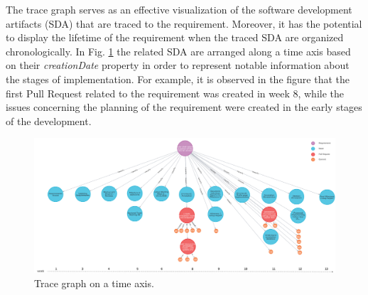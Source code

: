 The trace graph serves as an effective visualization of the software development artifacts (SDA) that are traced to the requirement. Moreover, it has the potential to display the lifetime of the requirement when the traced SDA are organized chronologically.
In Fig. \ref{fig:tracegraph} the related SDA are arranged along a time axis based on their \textit{creationDate} property in order to represent notable information about the stages of implementation. For example, it is observed in the figure that the first Pull Request related to the requirement was created in week 8, while the issues concerning the planning of the requirement were created in the early stages of the development.


\begin{figure}[htb]
    \centering
    \includegraphics[width=1\linewidth]{figs/traceGraph.png}
    \caption{Trace graph on a time axis.}
    \label{fig:tracegraph}
\end{figure}






